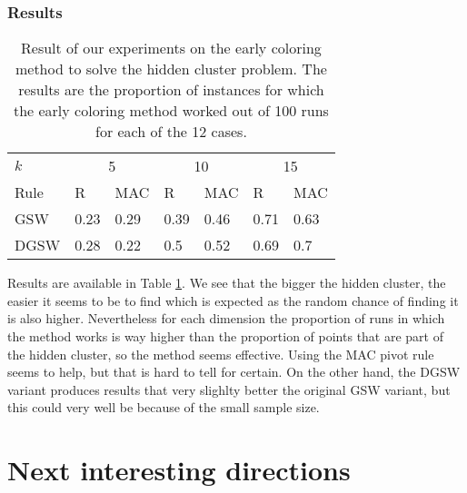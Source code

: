 \documentclass[12pt]{article}
\begin{document}
\subsubsection{Results}
\begin{center}
\begin{table}[h]
\begin{tabular}{l|ll|ll|ll}
$k$  & \multicolumn{2}{c}{5} & \multicolumn{2}{c}{10} & \multicolumn{2}{c}{15}\\
Rule &R&MAC&R&MAC&R&MAC\\ \hline
GSW  &0.23&0.29&0.39&0.46&0.71&0.63\\
DGSW &0.28&0.22&0.5&0.52&0.69&0.7\\
\end{tabular}
\caption{Result of our experiments on the early coloring method to solve the hidden cluster problem. The results are the proportion of instances for which the early coloring method worked out of 100 runs for each of the 12 cases.}
\label{early_coloring_method_exp1}
\end{table}
\end{center}
Results are available in Table \ref{early_coloring_method_exp1}. We see that the bigger the hidden cluster, the easier it seems to be to find which is expected as the random chance of finding it is also higher. Nevertheless for each dimension the proportion of runs in which the method works is way higher than the proportion of points that are part of the hidden cluster, so the method seems effective. Using the MAC pivot rule seems to help, but that is hard to tell for certain. On the other hand, the DGSW variant produces results that very slighlty better the original GSW variant, but this could very well be because of the small sample size.



\section{Next interesting directions}
\newpage


\newpage
\nocite{*}



\end{document}

